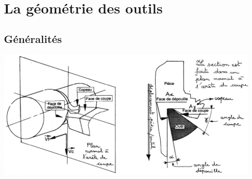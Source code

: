 \documentclass[11pt,oneside]{article}
\begin{document}
%
%
%
%
%
%	
%
%
%
%
%
%
%
%
%
%
%
%
%
%
%
			

\section{La géométrie des outils}
\subsection{Généralités}
                
\begin{center}
\includegraphics[width=.9\textwidth]{png/fig_11}
\end{center}
\end{document}

